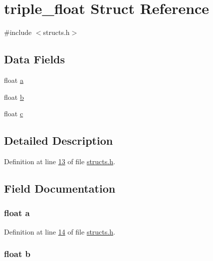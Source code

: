 \hypertarget{structtriple__float}{}\section{triple\+\_\+float Struct Reference}
\label{structtriple__float}


{\ttfamily \#include $<$structs.\+h$>$}

\subsection*{Data Fields}
\begin{DoxyCompactItemize}
\item 
float \hyperlink{structtriple__float_a4aec1a5be9d9a4a394a2e49e9744286e}{a}
\item 
float \hyperlink{structtriple__float_a83fc1af92e29717b4513d121b0c72c7d}{b}
\item 
float \hyperlink{structtriple__float_ae78103ab33f03590e84ff7bc735629d7}{c}
\end{DoxyCompactItemize}


\subsection{Detailed Description}


Definition at line \hyperlink{structs_8h_source_l00013}{13} of file \hyperlink{structs_8h_source}{structs.\+h}.



\subsection{Field Documentation}
\subsubsection[{\texorpdfstring{a}{a}}]{\setlength{\rightskip}{0pt plus 5cm}float a}\hypertarget{structtriple__float_a4aec1a5be9d9a4a394a2e49e9744286e}{}\label{structtriple__float_a4aec1a5be9d9a4a394a2e49e9744286e}


Definition at line \hyperlink{structs_8h_source_l00014}{14} of file \hyperlink{structs_8h_source}{structs.\+h}.

\subsubsection[{\texorpdfstring{b}{b}}]{\setlength{\rightskip}{0pt plus 5cm}float b}\hypertarget{structtriple__float_a83fc1af92e29717b4513d121b0c72c7d}{}\label{structtriple__float_a83fc1af92e29717b4513d121b0c72c7d}


